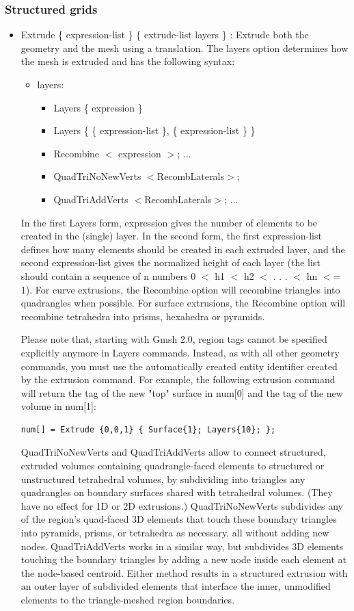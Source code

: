 \documentclass[dvipdfmx, 9pt, a4paper]{article}
\numberwithin{equation}{section}
\begin{document}
\subsubsection{Structured grids}
\begin{itemize}
\item Extrude \{ expression-list \} \{ extrude-list layers \} : Extrude both the geometry and the mesh using a translation. The layers option determines how the mesh is extruded and has the following syntax:
\begin{itemize}
\item layers:
\begin{itemize}
\item Layers \{ expression \}
\item Layers \{ \{ expression-list \}, \{ expression-list \} \}
\item Recombine $<$ expression $>$; ...
\item QuadTriNoNewVerts $<$RecombLaterals$>$;
\item QuadTriAddVerts $<$RecombLaterals$>$; ...
\end{itemize}
\end{itemize}
In the first Layers form, expression gives the number of elements to be created in the (single) layer. In the second form, the first expression-list defines how many elements should be created in each extruded layer, and the second expression-list gives the normalized height of each layer (the list should contain a sequence of n numbers 0 $<$ h1 $<$ h2 $<$ . . . $<$ hn $<$= 1). For curve extrusions, the Recombine option will recombine triangles into quadrangles when possible. For surface extrusions, the Recombine option will recombine tetrahedra into prisms, hexahedra or pyramids. \par
Please note that, starting with Gmsh 2.0, region tags cannot be specified explicitly anymore in Layers commands. Instead, as with all other geometry commands, you must use the automatically created entity identifier created by the extrusion command. For example, the following extrusion command will return the tag of the new "top" surface in num[0] and the tag of the new volume in num[1]:
\begin{lstlisting}
num[] = Extrude {0,0,1} { Surface{1}; Layers{10}; };
\end{lstlisting}
QuadTriNoNewVerts and QuadTriAddVerts allow to connect structured, extruded volumes containing quadrangle-faced elements to structured or unstructured tetrahedral volumes, by subdividing into triangles any quadrangles on boundary surfaces shared with tetrahedral volumes. (They have no effect for 1D or 2D extrusions.) QuadTriNoNewVerts subdivides any of the region's quad-faced 3D elements that touch these boundary triangles into pyramids, prisms, or tetrahedra as necessary, all without adding new nodes. QuadTriAddVerts works in a similar way, but subdivides 3D elements touching the boundary triangles by adding a new node inside each element at the node-based centroid. Either method results in a structured extrusion with an outer layer of subdivided elements that interface the inner, unmodified elements to the triangle-meshed region boundaries.\par

\end{itemize}
\end{document}
